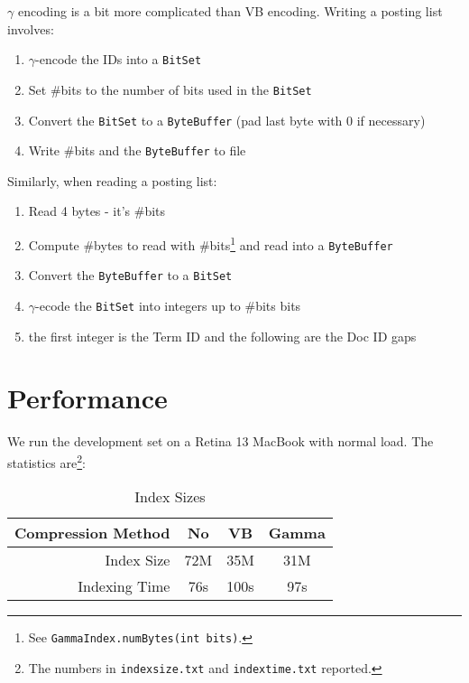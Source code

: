 \documentclass{article}
\newcommand{\tmtt}[1]{\texttt{#1}}
\newenvironment{enumeratenumeric}{\begin{enumerate}[1.] }{\end{enumerate}}
\begin{document}
$\gamma$ encoding is a bit more complicated than VB encoding. Writing a
posting list involves:
\begin{enumeratenumeric}
  \item $\gamma$-encode the IDs into a {\tmtt{BitSet}}
  
  \item Set \#bits to the number of bits used in the {\tmtt{BitSet}}
  
  \item Convert the {\tmtt{BitSet}} to a {\tmtt{ByteBuffer}} (pad last byte
  with 0 if necessary)
  
  \item Write \#bits and the {\tmtt{ByteBuffer}} to file
\end{enumeratenumeric}
Similarly, when reading a posting list:
\begin{enumeratenumeric}
  \item Read 4 bytes - it's \#bits
  
  \item Compute \#bytes to read with \#bits{\footnote{See
  {\tmtt{GammaIndex.numBytes(int bits)}}.}} and read into a
  {\tmtt{ByteBuffer}}
  
  \item Convert the {\tmtt{ByteBuffer}} to a {\tmtt{BitSet}}
  
  \item $\gamma$-ecode the {\tmtt{BitSet}} into integers up to \#bits bits
  
  \item the first integer is the Term ID and the following are the Doc ID gaps
\end{enumeratenumeric}

\section{Performance}

We run the development set on a Retina 13 MacBook with normal load. The
statistics are{\footnote{The numbers in {\tmtt{indexsize.txt}} and
{\tmtt{indextime.txt}} reported.}}:

\begin{table}[h]
  \begin{tabular}{|r|c|c|c|}
    \hline
    Compression Method & No & VB & Gamma\\
    \hline
    Index Size & 72M & 35M & 31M\\
    \hline
    Indexing Time & 76s & 100s & 97s\\
    \hline
  \end{tabular}
  \caption{Index Sizes}
\end{table}
\end{document}
